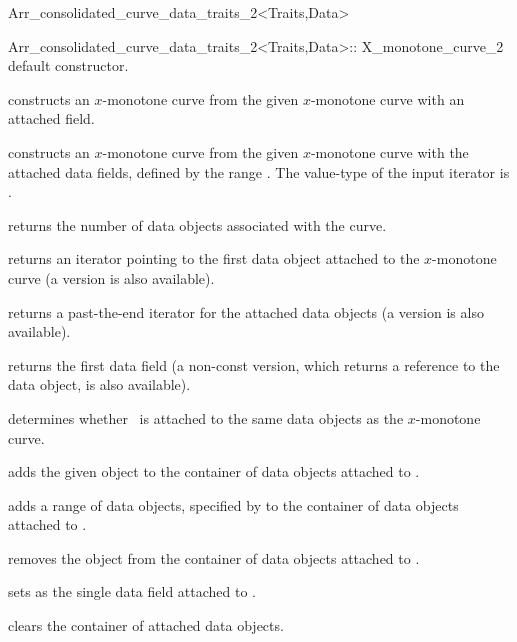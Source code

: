 \begin{ccRefClass}{Arr_consolidated_curve_data_traits_2<Traits,Data>}
\begin{ccClass}{Arr_consolidated_curve_data_traits_2<Traits,Data>::
                X_monotone_curve_2}
    {default constructor.}

    {constructs an $x$-monotone curve from the given  $x$-monotone
     curve with an attached  field.}

    {constructs an $x$-monotone curve from the given  $x$-monotone
     curve with the attached data fields, defined by the range 
     \ccc{[begin,end)}. The value-type of the input iterator is .}

\ccAccessFunctions

  {returns the number of data objects associated with the curve.}

  {returns an iterator pointing to the first data object attached to the
   $x$-monotone curve (a  version is also available).}

  {returns a past-the-end iterator for the attached data objects
   (a  version is also available).}

  {returns the first data field (a non-const version, which returns a reference
   to the data object, is also available).
   }

  {determines whether \ccVar\ is attached to the same data objects as
   the  $x$-monotone curve.}

\ccModifiers

  {adds the given  object to the container of data objects attached
   to \ccVar.}

  {adds a range of data objects, specified by \ccc{[begin,end)} to the
   container of data objects attached to \ccVar.}

  {removes the  object from the container of data objects attached
   to \ccVar.}

  {sets  as the single data field attached to \ccVar.}

  {clears the container of attached data objects.}

\end{ccClass}

\end{ccRefClass}

\ccRefPageEnd
